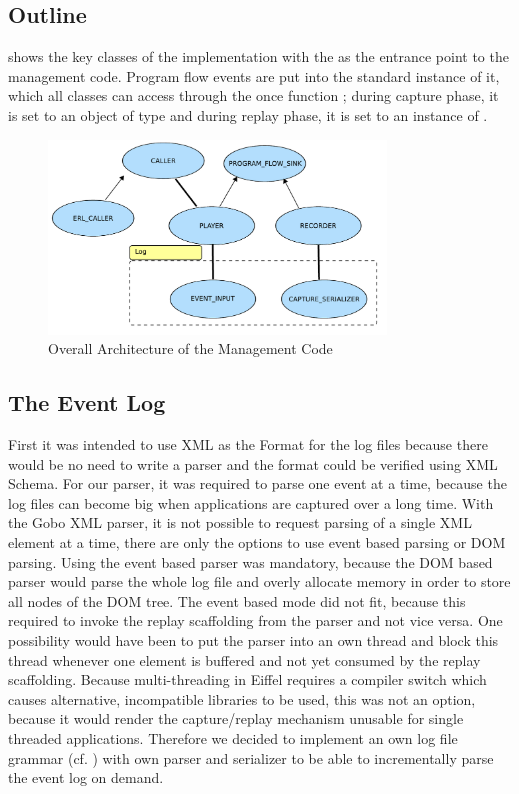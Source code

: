 \subsection{Outline}
  shows the key classes of the implementation with the  as the entrance point to the management code. Program flow events are put into the standard instance of it, which all classes can access through the once function ; during capture phase, it is set to an object of type  and during replay phase, it is set to an instance of .

\begin{figure}[ht]
  \centering
  \includegraphics[width=0.8\textwidth]{illustrations/implementation_overall_architecture}
  \caption{Overall Architecture of the Management Code}
  \label{fig:implementation_overall_architecture}
\end{figure}


\subsection{The Event Log}
First it was intended to use XML as the Format for the log files because there would be no need to write a parser and the format could be verified using XML Schema. For our parser, it was required to parse one event at a time, because the log files can become big when applications are captured over a long time. With the Gobo XML parser, it is not possible to request parsing of a single XML element at a time, there are only the options to use event based parsing or DOM parsing. Using the event based parser was mandatory, because the DOM based parser would parse the whole log file and overly allocate memory in order to store all nodes of the DOM tree. The event based mode did not fit, because this required to invoke the replay scaffolding from the parser and not vice versa. One possibility would have been to put the parser into an own thread and block this thread whenever one element is buffered and not yet consumed by the replay scaffolding. Because multi-threading in Eiffel requires a compiler switch which causes alternative, incompatible libraries to be used, this was not an option, because it would render the capture/replay mechanism unusable for single threaded applications.
Therefore we decided to implement an own log file grammar (cf. ) with own parser and serializer to be able to incrementally parse the event log on demand.


